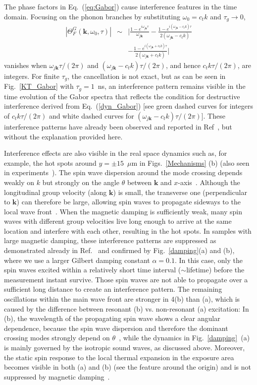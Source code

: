 \documentclass[aps,prb,twocolumn,superscriptaddress,floatfix]{revtex4}%
\def\ber{\begin{eqnarray}}
\def\eer{\end{eqnarray}}
\begin{document}
The phase factors in Eq.~(\ref{eq:Gabor}) cause interference features in the time domain. Focusing on the phonon branches by substituting $\omega_0=c_t k$ and  $\tau_g\to 0$, 
\ber
|\Theta^G_{F}(\mathbf{k},\omega_0,\tau)|	&\sim& 
\Big|\frac{1-e^{i\omega_{j\mathbf k}\tau}}{\omega_{j\mathbf{k}}}-\frac{1-e^{i(\omega_{j\mathbf k}-c_{t}k)\tau}}{2(\omega_{j\mathbf{k}}-c_{t}k)}\nonumber\\
&&-\frac{1-e^{i(\omega_{j\mathbf k}+c_{t}k)\tau}}{2(\omega_{j\mathbf{k}}+c_{t}k)}\Big|  \label{dyn_Gabor}
\eer 
vanishes when $\omega_{j\mathbf k} \tau/(2\pi)$ and $(\omega_{j\mathbf k}-c_t k )\tau/(2\pi)$, and hence $c_t k\tau/(2\pi)$, are integers. For finite $\tau_g$, the cancellation is not exact, but as can be seen in Fig.~\ref{KT_Gabor} with $\tau_g=1$~ns, an interference pattern remains visible in the time evolution of the Gabor spectra that reflects the condition  for destructive interference derived from Eq.~(\ref{dyn_Gabor}) [see green dashed curves for integers of $c_t k\tau/(2\pi)$ and white dashed curves for $(\omega_{j\mathbf k}-c_t k )\tau/(2\pi)$]. These interference patterns have already been observed and reported in Ref~\cite{Hashimoto17}, but without the explanation provided here.

Interference effects are also visible in the real space dynamics such as, for example, the hot spots around $y=\pm 15$~$\mu$m in Figs.~\ref{Mechanisms} (b) (also seen in experiments~\cite{Hashimoto2017b}). The spin wave dispersion around the mode crossing depends weakly on $k$ but strongly on the angle $\theta$ between $\mathbf k$ and $x$-axis~\cite{Hashimoto17}. Although the longitudinal group velocity (along $\mathbf k$) is small, the transverse one (perpendicular to $\mathbf k$) can therefore be large, allowing spin waves to propagate sideways to the local wave front~\cite{Shen15}. When the magnetic damping is sufficiently weak, many spin waves with different group velocities live long enough to arrive at the same location and interfere with each other, resulting in the hot spots. In samples with large magnetic damping, these interference patterns are suppressed as demonstrated already in Ref.~\cite{Shen15} and confirmed by Fig.~\ref{damping}(a) and (b), where we use a larger Gilbert damping constant $\alpha=0.1$. 
In this case, only the spin waves excited within a relatively short time interval ($\sim$lifetime) before the measurement instant survive. Those spin waves are not able to propagate over a sufficient long distance to create an interference pattern.
The remaining oscillations within the main wave front are stronger in 4(b) than (a), which is caused by the difference between resonant (b) vs. non-resonant (a) excitation: In (b), the wavelength of the propagating spin wave shows a clear angular dependence, because the spin wave dispersion and therefore the dominant crossing modes strongly depend on $\theta$~\cite{Hashimoto17}, 
while the dynamics in Fig.~\ref{damping}~(a) is mainly governed by the isotropic sound waves, as discussed above. Moreover, the static spin response to the local thermal expansion in the exposure area becomes visible in both (a) and (b) (see the feature around the origin) and is not suppressed by magnetic damping~\cite{Shen15}.
\end{document}
